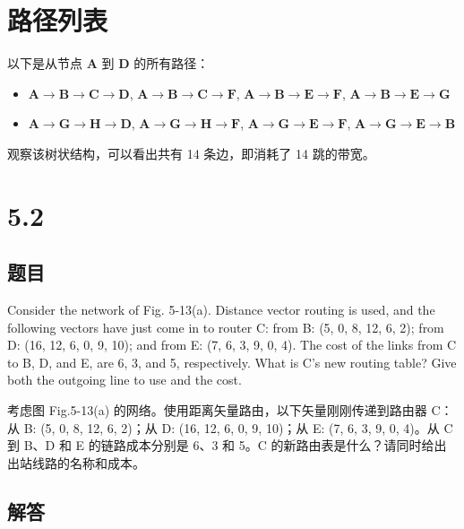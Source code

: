 \section*{路径列表}

以下是从节点 \textbf{A} 到 \textbf{D} 的所有路径：

\begin{itemize}
    \item \(\textbf{A} \rightarrow \textbf{B} \rightarrow \textbf{C} \rightarrow \textbf{D}\), \(\textbf{A} \rightarrow \textbf{B} \rightarrow \textbf{C} \rightarrow \textbf{F}\), \(\textbf{A} \rightarrow \textbf{B} \rightarrow \textbf{E} \rightarrow \textbf{F}\), \(\textbf{A} \rightarrow \textbf{B} \rightarrow \textbf{E} \rightarrow \textbf{G}\)
    \item \(\textbf{A} \rightarrow \textbf{G} \rightarrow \textbf{H} \rightarrow \textbf{D}\),  \(\textbf{A} \rightarrow \textbf{G} \rightarrow \textbf{H} \rightarrow \textbf{F}\),  \(\textbf{A} \rightarrow \textbf{G} \rightarrow \textbf{E} \rightarrow \textbf{F}\),  \(\textbf{A} \rightarrow \textbf{G} \rightarrow \textbf{E} \rightarrow \textbf{B}\)
\end{itemize}

观察该树状结构，可以看出共有 14 条边，即消耗了 14 跳的带宽。

\section{5.2}

\subsection*{题目}
Consider the network of Fig. 5-13(a). Distance vector routing is used, and the following vectors have just come in to router C: from B: (5, 0, 8, 12, 6, 2); from D: (16, 12, 6, 0, 9, 10); and from E: (7, 6, 3, 9, 0, 4). The cost of the links from C to B, D, and E, are 6, 3, and 5, respectively. What is C’s new routing table? Give both the outgoing line to use and the cost.

考虑图 Fig.5-13(a) 的网络。使用距离矢量路由，以下矢量刚刚传递到路由器 C：从 B: (5, 0, 8, 12, 6, 2)；从 D: (16, 12, 6, 0, 9, 10)；从 E: (7, 6, 3, 9, 0, 4)。从 C 到 B、D 和 E 的链路成本分别是 6、3 和 5。C 的新路由表是什么？请同时给出出站线路的名称和成本。

\subsection*{解答}

